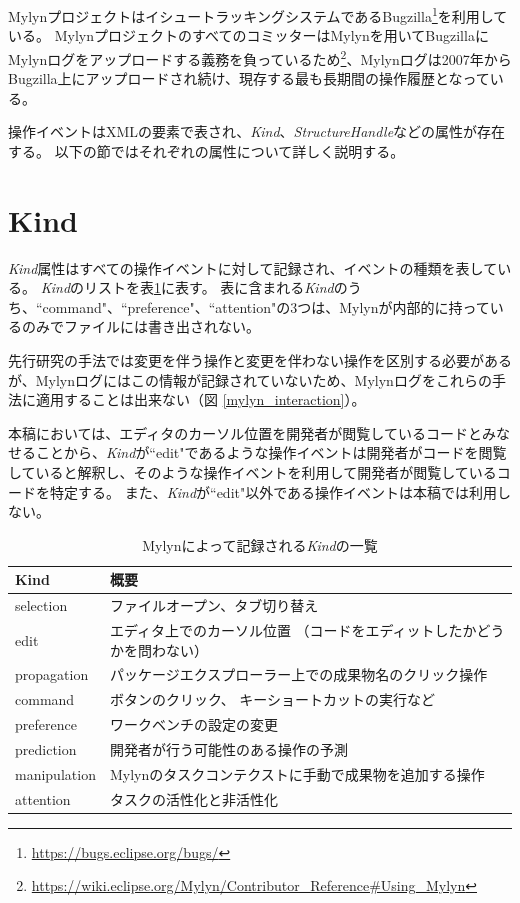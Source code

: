 \documentclass[a4paper]{jsbook}
\begin{document}
MylynプロジェクトはイシュートラッキングシステムであるBugzilla\footnote{\url{https://bugs.eclipse.org/bugs/}}を利用している。
MylynプロジェクトのすべてのコミッターはMylynを用いてBugzillaにMylynログをアップロードする義務を負っているため\footnote{\url{https://wiki.eclipse.org/Mylyn/Contributor_Reference\#Using_Mylyn}}、Mylynログは2007年からBugzilla上にアップロードされ続け、現存する最も長期間の操作履歴となっている。

操作イベントはXMLの要素で表され、{\it Kind}、{\it StructureHandle}などの属性が存在する。
以下の節ではそれぞれの属性について詳しく説明する。

\section{Kind}\label{kind_sec}
{\it Kind}属性はすべての操作イベントに対して記録され、イベントの種類を表している。
{\it Kind}のリストを表\ref{kind_table}に表す。
表に含まれる{\it Kind}のうち、``command"、``preference"、``attention"の3つは、Mylynが内部的に持っているのみでファイルには書き出されない。

先行研究\cite{6233415,KatoJapanese:2011,ss2012-76,ss2013-84,Yamamori:2016}の手法では変更を伴う操作と変更を伴わない操作を区別する必要があるが、Mylynログにはこの情報が記録されていないため、Mylynログをこれらの手法に適用することは出来ない（図 \ref{mylyn_interaction}）。

本稿においては、エディタのカーソル位置を開発者が閲覧しているコードとみなせることから、{\it Kind}が``edit"であるような操作イベントは開発者がコードを閲覧していると解釈し、そのような操作イベントを利用して開発者が閲覧しているコードを特定する。
また、{\it Kind}が``edit"以外である操作イベントは本稿では利用しない。

\begin{table}[tb]
  \centering
  \caption{Mylynによって記録される{\it Kind}の一覧}
  \label{kind_table}
\begin{tabular}{ll}
  \hline
  Kind & 概要\\
  \hline
  selection & ファイルオープン、タブ切り替え\\
  edit & エディタ上でのカーソル位置 （コードをエディットしたかどうかを問わない）\\
  propagation & パッケージエクスプローラー上での成果物名のクリック操作\\
  command & ボタンのクリック、 キーショートカットの実行など\\
  preference & ワークベンチの設定の変更\\
  prediction & 開発者が行う可能性のある操作の予測\cite{Kersten:2006}\\
  manipulation & Mylynのタスクコンテクストに手動で成果物を追加する操作\\
  attention & タスクの活性化と非活性化\\
  \hline
\end{tabular}
\end{table}
\end{document}
